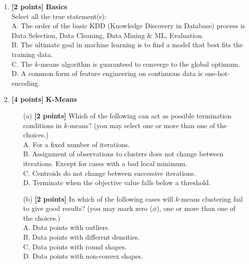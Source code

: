 \documentclass[10pt]{article}
\begin{document}
\begin{enumerate}

	\item \textbf{[2 points]} \textbf{Basics} \\
	      Select all the true statement(s): \\
	      A. The order of the basic KDD (Knowledge Discovery in Database) process is Data Selection, Data Cleaning, Data Mining \& ML, Evaluation. \\
	      B. The ultimate goal in machine learning is to find a model that best fits the training data. \\
	      C. The $k$-means algorithm is guaranteed to converge to the global optimum. \\
	      D. A common form of feature engineering on continuous data is one-hot-encoding. \\

	\item \textbf{[4 points]} \textbf{K-Means}
	      \begin{itemize}

		      \item[(a)] \textbf{[2 points]}
		            Which of the following can act as possible termination conditions in $k$-means?
		            (you may select one or more than one of the choices.)\\
		            A. For a fixed number of iterations.\\
		            B. Assignment of observations to clusters does not change between iterations. Except for cases with a bad local minimum.\\
		            C. Centroids do not change between successive iterations.\\
		            D. Terminate when the objective value falls below a threshold. \\


		      \item[(b)] \textbf{[2 points]}
		            In which of the following cases will $k$-means clustering fail to give good results?
		            (you may mark zero ($\phi$), one or more than one of the choices.)\\
		            A. Data points with outliers.\\
		            B. Data points with different densities.\\
		            C. Data points with round shapes.\\
		            D. Data points with non-convex shapes. \\


\end{itemize}
\end{enumerate}
\end{document}
